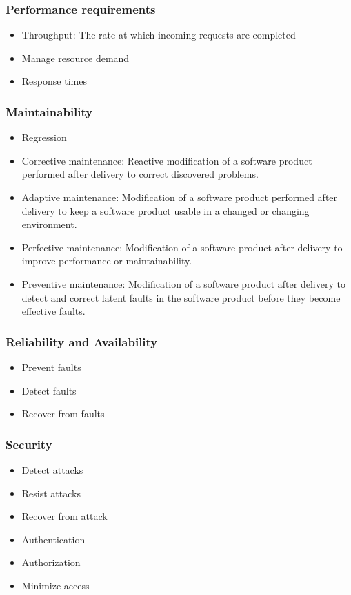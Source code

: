 \documentclass[12pt, oneside]{article}
\begin{document}
		\subsubsection{Performance requirements}
			\begin{itemize}
				\item Throughput: The rate at which incoming requests are completed
				\item Manage resource demand
				\item Response times
			\end{itemize}
		\subsubsection{Maintainability}
			\begin{itemize}
				\item Regression
				\item Corrective maintenance: Reactive modification of a software product performed after delivery to correct discovered problems.
				\item Adaptive maintenance: Modification of a software product performed after delivery to keep a software product usable in a changed or changing environment.
				\item Perfective maintenance: Modification of a software product after delivery to improve performance or maintainability.
				\item Preventive maintenance: Modification of a software product after delivery to detect and correct latent faults in the software product before they become effective faults.
			\end{itemize}
		\subsubsection{Reliability and Availability}
			\begin{itemize}
				\item Prevent faults
				\item Detect faults
				\item Recover from faults
			\end{itemize}
		\subsubsection{Security}
			\begin{itemize}
				\item Detect attacks 
				\item Resist attacks
				\item Recover from attack
				\item Authentication
				\item Authorization
				\item Minimize access
			\end{itemize}
\end{document}
